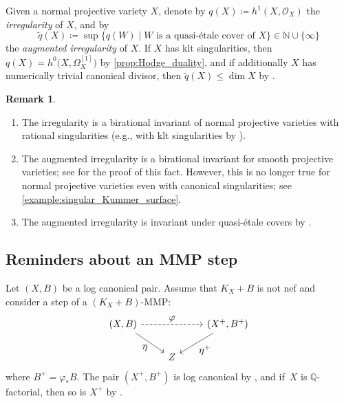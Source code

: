 \documentclass[JEP,XML,SOM,Unicode,published]{cedram}
\let\ts\textstyle
\theoremstyle{plain}
\theoremstyle{definition}
\newtheorem{rem}[thm]{Remark}
\newcommand{\N}{\mathbb{N}}
\newcommand{\Q}{\mathbb{Q}}
\newcommand{\OO}{\mathcal{O}}
\begin{document}
Given a normal projective variety $X$, denote by
$q(X) \coloneqq h^1(X,\OO_X)$
the \emph{irregularity} of $ X $, and by
\[
\widetilde{q}(X) \coloneqq \sup \bigl\{ q(W) \mid W \text{ is a quasi-étale cover of } X \bigr\} \in \N \cup \{\infty\}
\]
the \emph{augmented irregularity} of $ X $.
If $X$ has klt singularities, then
$ q(X) = h^0 \bigl(X, \Omega_X^{[1]} \bigr) $
by \autoref{prop:Hodge_duality}, and if additionally $ X $ has numerically trivial canonical divisor, then $\widetilde{q}(X) \leq \dim X$ by \cite[Lem.\,2.19.2]{GGK19}.

\skpt
\begin{rem}
\label{rem:augmented_irreg}
\begin{enumerate}
\item\label{rem:augmented_irregi}
The irregularity is a birational invariant of normal projective varieties with rational singularities
(e.g., with klt singularities by \cite[Th.\,5.22]{KM98}).

\item\label{rem:augmented_irregii}
The augmented irregularity is a birational invariant for smooth projective varieties; see \cite[\S 2]{Anella21b} for the proof of this fact. However, this is no longer true for normal projective varieties even with canonical singularities; see \autoref{example:singular_Kummer_surface}.

\item\label{rem:augmented_irregiii}
The augmented irregularity is invariant under quasi-étale covers by \cite[Lem.\,2.19.1]{GGK19}.
\end{enumerate}
\end{rem}

\subsection{Reminders about an MMP step}
\label{subsection:MMP_step}

Let $(X,B)$ be a log canonical pair. Assume that $K_X + B$ is not nef and consider a step of a $(K_X+B)$-MMP:
\[
\begin{tikzcd}
(X, B) \arrow[dr, "\ts \eta" swap] \arrow[rr, "\ts \varphi", dashed] && (X^+, B^+) \arrow[dl, "\ts \eta^+"] \\
& Z
\end{tikzcd}
\]
where $B^+ = \varphi_* B$. The pair $(X^+, B^+)$ is log canonical by \cite[Lem.\,2.3.27]{Fuj17book}, and if~$X$ is $\Q$\nobreakdash-factorial, then so is $X^+$ by \cite[Prop.\,4.8.18 \& Prop.\,4.8.20]{Fuj17book}.
\end{document}
